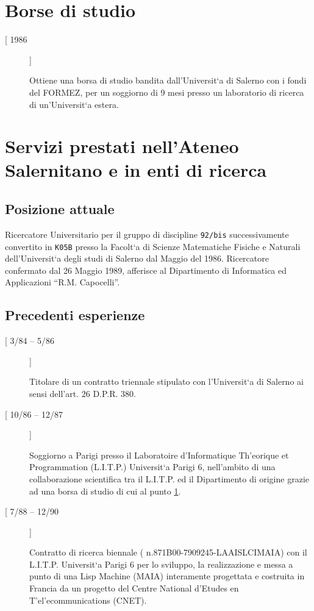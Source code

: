 \documentclass[11pt]{article}
\newlength{\boxsize}
\begin{document}
\section{Borse di studio}
\label{borse}
\begin{description}
\item [[ 1986]]
\hfill  \parbox[t]{\boxsize} {Ottiene una borsa di studio bandita
dall'Universit\a`a di Salerno con i fondi del FORMEZ, per un soggiorno
di 9 mesi presso un laboratorio di ricerca di un'Universit\a`a estera.}
\end{description}

\section{Servizi prestati nell'Ateneo Salernitano e in enti di ricerca}
\subsection{Posizione attuale}
 Ricercatore Universitario per il gruppo di discipline {\tt 92/bis}
 successivamente convertito in {\tt K05B} presso la Facolt\a`a di
 Scienze Matematiche Fisiche e Naturali dell'Universit\a`a degli studi
 di Salerno dal Maggio del 1986. Ricercatore confermato dal 26 Maggio 1989,
 afferisce al Dipartimento di Informatica ed Applicazioni ``{R.M. Capocelli}''.

\subsection{Precedenti esperienze}
\begin{description}
\item [[ 3/84 -- 5/86]]
\hfill  \parbox[t]{\boxsize} {Titolare di un contratto triennale
stipulato con l'Universit\a`a di Salerno ai sensi dell'art. 26 D.P.R.
380.}

\item [[ 10/86 -- 12/87]]
\hfill  \parbox[t]{\boxsize} {Soggiorno a Parigi
presso il Laboratoire d'Informatique Th\a'eorique et Programmation
(L.I.T.P.) Universit\a`a Parigi 6, nell'ambito di una collaborazione
scientifica tra il L.I.T.P. ed il Dipartimento di origine grazie ad una
borsa di studio di cui al punto \ref{borse}.}

\item [[ 7/88 -- 12/90]] \hfill \parbox[t]{\boxsize} {Contratto di
ricerca biennale ( n.871B00-7909245-LAAISLCIMAIA) con il L.I.T.P.
Universit\a`a Parigi 6 per lo sviluppo, la realizzazione e messa a
punto di una Lisp Machine (MAIA) interamente progettata e costruita in
Francia da un progetto del Centre National d'Etudes en
T\a'el\a'ecommunications (CNET).}
\end{description}
\end{document}
